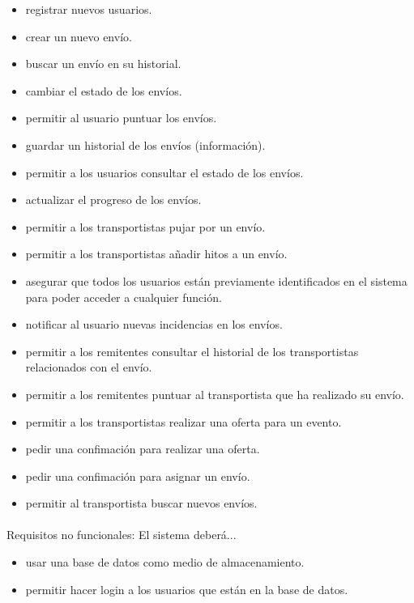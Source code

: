 \documentclass[10pt, a4paper,spanish]{article}
\begin{document}
			\begin{itemize}
				\item registrar nuevos usuarios.
				\item crear un nuevo envío.
				\item buscar un envío en su historial.
				\item cambiar el estado de los envíos.
				\item permitir al usuario puntuar los envíos.
				\item guardar un historial de los envíos (información).
				\item permitir a los usuarios consultar el estado de los envíos.
				\item actualizar el progreso de los envíos.
				\item permitir a los transportistas pujar por un envío.
				\item permitir a los transportistas añadir hitos a un envío.
				\item asegurar que todos los usuarios están previamente identificados en el sistema para poder acceder a cualquier función.
				\item notificar al usuario nuevas incidencias en los envíos.
				\item permitir a los remitentes consultar el historial de los transportistas relacionados con el envío.
				\item permitir a los remitentes puntuar al transportista que ha realizado su envío.
				\item permitir a los transportistas realizar una oferta para un evento.
				\item pedir una confimación para realizar una oferta.
				\item pedir una confimación para asignar un envío.
				\item permitir al transportista buscar nuevos envíos.
			\end{itemize}

			\paragraph{}
			Requisitos no funcionales: El sistema deberá...

				\begin{itemize}
					\item usar una base de datos como medio de almacenamiento.
					\item permitir hacer login a los usuarios que están en la base de datos.
				\end{itemize}
\end{document}
